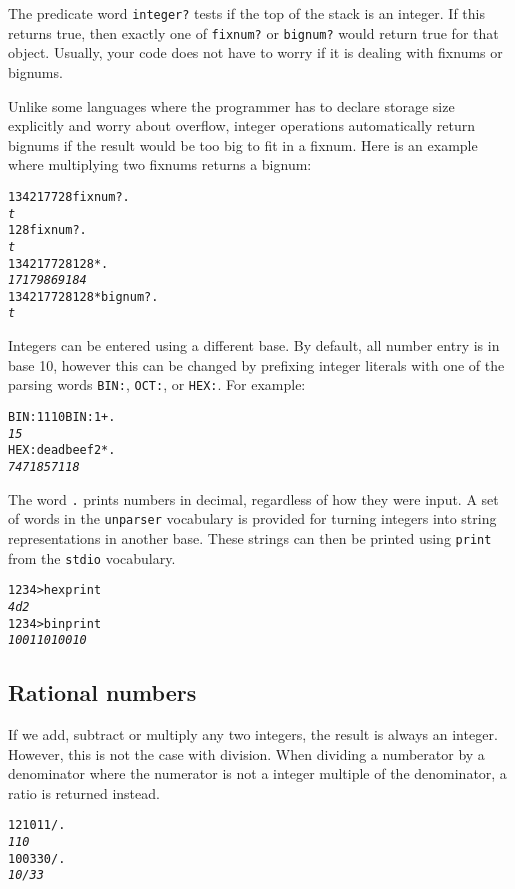 \documentclass[english]{article}
\begin{document}
The predicate word \texttt{integer?} tests if the top of the stack is an integer. If this returns true, then exactly one of \texttt{fixnum?} or \texttt{bignum?} would return true for that object. Usually, your code does not have to worry if it is dealing with fixnums or bignums.

Unlike some languages where the programmer has to declare storage size explicitly and worry about overflow, integer operations automatically return bignums if the result would be too big to fit in a fixnum. Here is an example where multiplying two fixnums returns a bignum:

\begin{alltt}
134217728 fixnum? .
\emph{t}
128 fixnum? .
\emph{t}
134217728 128 * .
\emph{17179869184}
134217728 128 * bignum? .
\emph{t}
\end{alltt}

Integers can be entered using a different base. By default, all number entry is in base 10, however this can be changed by prefixing integer literals with one of the parsing words \texttt{BIN:}, \texttt{OCT:}, or \texttt{HEX:}. For example:

\begin{alltt}
BIN: 1110 BIN: 1 + .
\emph{15}
HEX: deadbeef 2 * .
\emph{7471857118}
\end{alltt}

The word \texttt{.} prints numbers in decimal, regardless of how they were input. A set of words in the \texttt{unparser} vocabulary is provided for turning integers into string representations in another base. These strings can then be printed using \texttt{print} from the \texttt{stdio} vocabulary.

\begin{alltt}
1234 >hex print
\emph{4d2}
1234 >bin print
\emph{10011010010}
\end{alltt}

\subsection{Rational numbers}

If we add, subtract or multiply any two integers, the result is always an integer. However, this is not the case with division. When dividing a numberator by a denominator where the numerator is not a integer multiple of the denominator, a ratio is returned instead.

\begin{alltt}
1210 11 / .
\emph{110}
100 330 / .
\emph{10/33}
\end{alltt}
\end{document}
